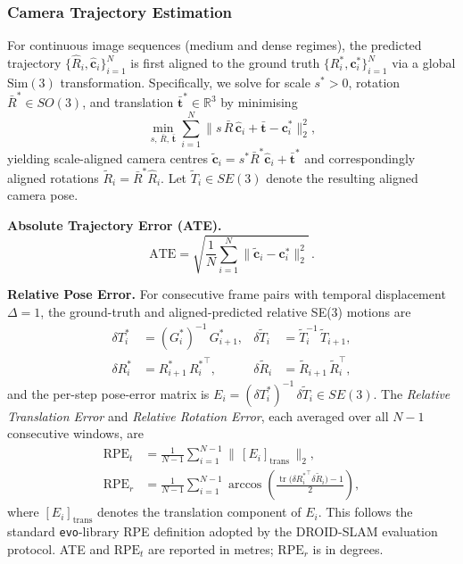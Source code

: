 \subsubsection{Camera Trajectory Estimation}
\label{appendix:metrics:traj}

For continuous image sequences (medium and dense regimes), the predicted trajectory $\{\hat{R}_i,\hat{\mathbf{c}}_i\}_{i=1}^{N}$ is first aligned to the ground truth $\{R_i^{*},\mathbf{c}_i^{*}\}_{i=1}^{N}$ via a global $\mathrm{Sim}(3)$ transformation.
%
Specifically, we solve for scale $s^{*}\!>0$, rotation $\bar{R}^{*}\!\in SO(3)$, and translation $\bar{\mathbf{t}}^{*}\!\in\mathbb{R}^{3}$ by minimising
\begin{equation}
  \min_{s,\,\bar{R},\,\bar{\mathbf{t}}}
  \sum_{i=1}^{N}
  \bigl\|s\,\bar{R}\,\hat{\mathbf{c}}_i + \bar{\mathbf{t}} - \mathbf{c}_i^{*}\bigr\|_2^2,
  \label{eq:sim3_align}
\end{equation}
yielding scale-aligned camera centres
$\tilde{\mathbf{c}}_i = s^{*}\bar{R}^{*}\hat{\mathbf{c}}_i + \bar{\mathbf{t}}^{*}$ and correspondingly aligned rotations $\tilde{R}_i = \bar{R}^{*}\hat{R}_i$. Let $\tilde{T}_i\in SE(3)$ denote the resulting aligned camera pose.

\textbf{Absolute Trajectory Error (ATE).}
\begin{equation}
  \mathrm{ATE}
  = \sqrt{\frac{1}{N}\sum_{i=1}^{N}
    \bigl\|\tilde{\mathbf{c}}_i - \mathbf{c}_i^{*}\bigr\|_2^2}\,.
  \label{eq:ate}
\end{equation}

\textbf{Relative Pose Error.}
For consecutive frame pairs with temporal displacement $\Delta=1$, the ground-truth and aligned-predicted relative SE(3) motions are
\begin{align}
  \delta T_i^{*}    &= (G_i^{*})^{-1}\,G_{i+1}^{*},
  &\delta\tilde{T}_i &= \tilde{T}_i^{-1}\,\tilde{T}_{i+1},\\
  \delta R_i^{*}    &= R_{i+1}^{*}\,{R_i^{*}}^{\!\top},
  &\delta\tilde{R}_i &= \tilde{R}_{i+1}\,\tilde{R}_i^{\top},
\end{align}
and the per-step pose-error matrix is $E_i = (\delta T_i^{*})^{-1}\,\delta\tilde{T}_i \in SE(3)$.
The \emph{Relative Translation Error} and \emph{Relative Rotation Error}, each averaged over all $N\!-\!1$ consecutive windows, are
\begin{align}
  \mathrm{RPE}_{t}
  &= \frac{1}{N-1}\sum_{i=1}^{N-1}
    \bigl\|\,[E_i]_{\mathrm{trans}}\,\bigr\|_2,
  \label{eq:rpet}\\
  \mathrm{RPE}_{r}
  &= \frac{1}{N-1}\sum_{i=1}^{N-1}
    \arccos\!\left(\frac{\operatorname{tr}\!\bigl({\delta R_i^{*}}^{\!\top}\delta\tilde{R}_i\bigr)-1}{2}\right),
  \label{eq:rper}
\end{align}
where $[E_i]_{\mathrm{trans}}$ denotes the translation component of $E_i$. This follows the standard \texttt{evo}-library RPE definition adopted by the DROID-SLAM evaluation protocol.
ATE and $\mathrm{RPE}_{t}$ are reported in metres; $\mathrm{RPE}_{r}$ is in degrees.

